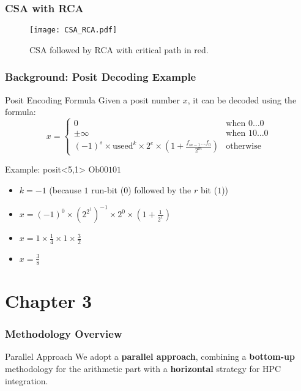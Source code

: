 \begin{frame}
    \frametitle{CSA with RCA}
    \begin{figure}[H]
        \centering
        \texttt{[image: CSA\_RCA.pdf]}
        \caption{CSA followed by RCA with critical path in red.}
    \end{figure}
\end{frame}



\begin{frame}
    \frametitle{Background: Posit Decoding Example}

            \begin{block}{Posit Encoding Formula}
                Given a posit number \( x \), it can be decoded using the formula:
                \[
                x =
                \begin{cases}
                0 & \text{when } 0\ldots0 \\
                \pm\infty & \text{when } 10\ldots0 \\
                (-1)^s \times \text{useed}^k \times 2^e \times \left(1 + \frac{f_{m-1}\ldots f_0}{2^m}\right) & \text{otherwise}
                \end{cases}
                \]
            \end{block}

            \begin{block}{Example: posit<5,1> \( \text{Ob00101} \)}
                \begin{itemize}
                    \item \( k = -1 \) (because \( 1 \) run-bit (\( 0 \)) followed by the \( r \) bit (\( 1 \)))
                    \item \( x = (-1)^0 \times (2^{2^1})^{-1} \times 2^0 \times \left( 1 + \frac{1}{2^1} \right) \)
                    \item \( x = 1 \times \frac{1}{4} \times 1 \times \frac{3}{2} \)
                    \item \( x = \frac{3}{8} \)
                \end{itemize}
            \end{block}
\end{frame}


\section{Chapter 3}

\begin{frame}
    \frametitle{Methodology Overview}

        \begin{block}{Parallel Approach}
		We adopt a \textbf{parallel approach}, combining a \textbf{bottom-up} methodology for the arithmetic part with a \textbf{horizontal} strategy for HPC integration.
        \end{block}

\end{frame}

